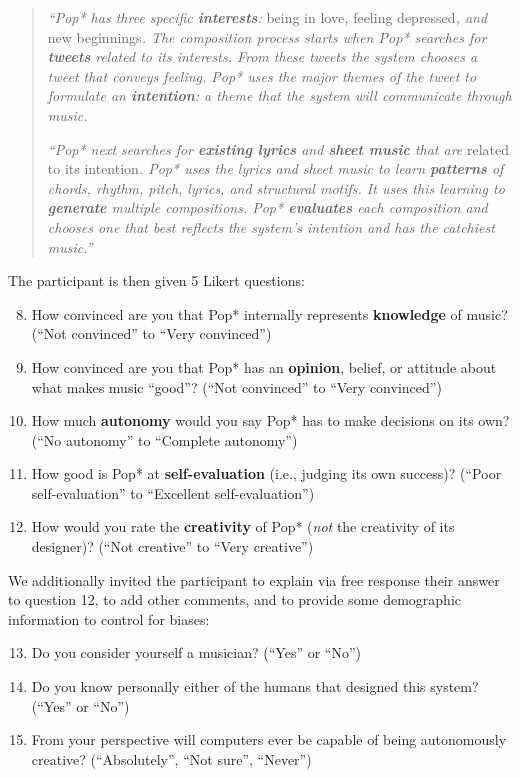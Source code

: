 \documentclass[phd,electronic,oneside,twosidetoc,letterpaper,chaptercenter,parttop,lof,lot]{byumsphd}
\begin{document}
\begin{quote}
\textit{``Pop* has three specific \textbf{interests}:} being in love\textit{,} feeling depressed\textit{, and} new beginnings\textit{. The composition process starts when Pop* searches for \textbf{tweets} related to its interests. From these tweets the system chooses a tweet that conveys feeling. Pop* uses the major themes of the tweet to formulate an \textbf{intention}: a theme that the system will communicate through music.}
 
\textit{``Pop* next searches for \textbf{existing lyrics} and \textbf{sheet music} that are} related to its intention\textit{. Pop* uses the lyrics and sheet music to learn \textbf{patterns} of chords, rhythm, pitch, lyrics, and structural motifs. It uses this learning to \textbf{generate} multiple compositions. Pop* \textbf{evaluates} each composition and chooses one that best reflects the system's intention and has the catchiest music.''}
\end{quote}

The participant is then given 5 Likert questions:

\begin{enumerate}
  \setcounter{enumi}{7}
\item How convinced are you that Pop* internally represents \textbf{knowledge} of music? (``Not convinced''	to ``Very convinced'')
\item How convinced are you that Pop* has an \textbf{opinion}, belief, or attitude about what makes music ``good''? (``Not convinced'' to ``Very convinced'')
\item How much \textbf{autonomy} would you say Pop* has to make decisions on its own? (``No autonomy'' to ``Complete autonomy'')
\item How good is Pop* at \textbf{self-evaluation} (i.e., judging its own success)? (``Poor self-evaluation'' to ``Excellent self-evaluation'')
\item How would you rate the \textbf{creativity} of Pop* (\textit{not} the creativity of its designer)? (``Not creative'' to ``Very creative'')
\end{enumerate}

We additionally invited the participant to explain via free response their answer to question 12, to add other comments, and to provide some demographic information to control for biases:

\begin{enumerate}
  \setcounter{enumi}{12}
\item Do you consider yourself a musician? (``Yes'' or ``No'')
\item Do you know personally either of the humans that designed this system? (``Yes'' or ``No'')
\item From your perspective will computers ever be capable of being autonomously creative?  (``Absolutely'', ``Not sure'', ``Never'')
\end{enumerate}
\end{document}
